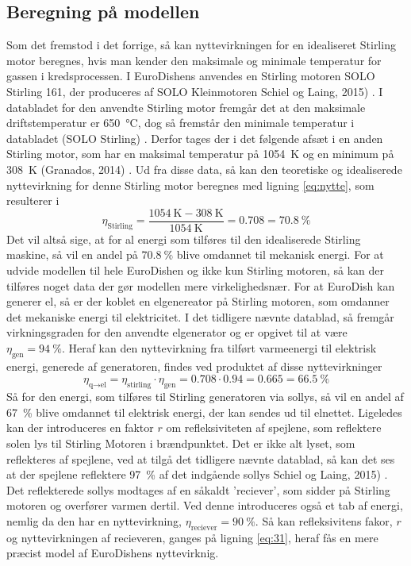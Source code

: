 \documentclass[SRC.tex]{subfiles}
\begin{document}
	\subsection{Beregning på modellen}
	Som det fremstod i det forrige, så kan nyttevirkningen for en idealiseret Stirling motor beregnes, hvis man kender den maksimale og minimale temperatur for gassen i kredsprocessen. I EuroDishens anvendes en Stirling motoren SOLO Stirling 161, der produceres af SOLO Kleinmotoren Schiel og Laing, 2015) . I databladet for den anvendte Stirling motor fremgår det at den maksimale driftstemperatur er \SI{650}{\celsius}, dog så fremstår den minimale temperatur i databladet (SOLO Stirling) . Derfor tages der i det følgende afsæt i en anden Stirling motor, som har en maksimal temperatur på \SI{1054}{\kelvin} og en minimum på \SI{308}{\kelvin} (Granados, 2014) . 
	Ud fra disse data, så kan den teoretiske og idealiserede nyttevirkning for denne Stirling motor beregnes med ligning \eqref{eq:nytte}, som resulterer i
	\begin{equation}
		\eta_{\text{Stirling}} = \frac{\SI{1054}{\kelvin} - \SI{308}{\kelvin}}{\SI{1054}{\kelvin}} = 0.708 = \SI{70.8}{\percent}
	\end{equation}
	Det vil altså sige, at for al energi som tilføres til den idealiserede Stirling maskine, så vil en andel på \(\SI{70.8}{\percent}\) blive omdannet til mekanisk energi. For at udvide modellen til hele EuroDishen og ikke kun Stirling motoren, så kan der tilføres noget data der gør modellen mere virkelighedsnær. For at EuroDish kan generer el, så er der koblet en elgenereator på Stirling motoren, som omdanner det mekaniske energi til elektricitet. I det tidligere nævnte datablad, så fremgår virkningsgraden for den anvendte elgenerator og er opgivet til at være \(\eta_{\text{gen}} = \SI{94}{\percent}\). Heraf kan den nyttevirkning fra tilført varmeenergi til elektrisk energi, generede af generatoren, findes ved produktet af disse nyttevirkninger
	\begin{equation}
		\eta_{\text{q}\rightarrow\text{el}} =  \eta_{\text{stirling}} \cdot \eta_{\text{gen}} = 0.708 \cdot 0.94 = 0.665 = \SI{66.5}{\percent}
		\label{eq:31}
	\end{equation}
	Så for den energi, som tilføres til Stirling generatoren via sollys, så vil en andel af \SI{67}{\percent} blive omdannet til elektrisk energi, der kan sendes ud til elnettet. Ligeledes kan der introduceres en faktor \(r\) om refleksiviteten af spejlene, som reflektere solen lys til Stirling Motoren i brændpunktet. Det er ikke alt lyset, som reflekteres af spejlene, ved at tilgå det tidligere nævnte datablad, så kan det ses at der spejlene reflektere \SI{97}{\percent} af det indgående sollys Schiel og Laing, 2015) . Det reflekterede sollys modtages af en såkaldt 'reciever', som sidder på Stirling motoren og overfører varmen dertil. Ved denne introduceres også et tab af energi, nemlig da den har en nyttevirkning, \(\eta_{\text{reciever}} = \SI{90}{\percent}\). Så kan refleksivitens fakor, \(r\) og nyttevirkningen af recieveren, ganges på ligning \eqref{eq:31}, heraf fås en mere præcist model af EuroDishens nyttevirknig.
\end{document}

